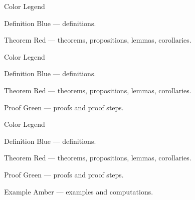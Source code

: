 \documentclass[aspectratio=169,12pt,t]{beamer}
\begin{document}
{%
\begin{frame}{Color Legend}
  \begin{defblock}{Definition}
    Blue --- \alert{definitions}.
  \end{defblock}
  \vspace{-0.6em}
  \begin{thmblock}{Theorem}
    Red --- \alert{theorems}, propositions, lemmas, corollaries.
  \end{thmblock}

\end{frame}

\begin{frame}{Color Legend}
  \begin{defblock}{Definition}
    Blue --- \alert{definitions}.
  \end{defblock}
  \vspace{-0.6em}
  \begin{thmblock}{Theorem}
    Red --- \alert{theorems}, propositions, lemmas, corollaries.
  \end{thmblock}
  \vspace{-0.6em}
  \begin{proofblock}{Proof}
    Green --- \alert{proofs} and proof steps.
  \end{proofblock}

\end{frame}

\begin{frame}{Color Legend}
  \begin{defblock}{Definition}
    Blue --- \alert{definitions}.
  \end{defblock}
  \vspace{-0.6em}
  \begin{thmblock}{Theorem}
    Red --- \alert{theorems}, propositions, lemmas, corollaries.
  \end{thmblock}
  \vspace{-0.6em}
  \begin{proofblock}{Proof}
    Green --- \alert{proofs} and proof steps.
  \end{proofblock}
  \vspace{-0.6em}
  \begin{exblock}{Example}
    Amber --- \alert{examples} and computations.
  \end{exblock}


\end{frame}}
\end{document}
